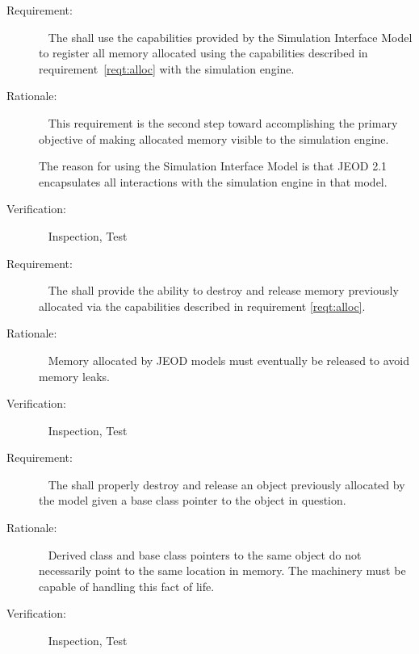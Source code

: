 \label{reqt:registration}
\begin{description}
\item[Requirement:]\ \newline
  The \ModelDesc shall use the capabilities provided by the Simulation
  Interface Model to register all memory allocated using the capabilities
  described in requirement~\ref{reqt:alloc} with the simulation engine.

\item[Rationale:]\ \newline
  This requirement is the second step toward accomplishing the primary objective
  of making allocated memory visible to the simulation engine.

  The reason for using the Simulation Interface Model is that JEOD 2.1
  encapsulates all interactions with the simulation engine in that model.

\item[Verification:]\ \newline
  Inspection, Test
\end{description}


\label{reqt:free}
\begin{description}
\item[Requirement:]\ \newline
  The \ModelDesc shall provide the ability to destroy and release memory
  previously allocated via the capabilities described in requirement
  \ref{reqt:alloc}.

\item[Rationale:]\ \newline
  Memory allocated by JEOD models must eventually be released to
  avoid memory leaks.

\item[Verification:]\ \newline
  Inspection, Test
\end{description}


\label{reqt:base_class_pointer_free}
\begin{description}
\item[Requirement:]\ \newline
  The \ModelDesc shall properly destroy and release an object previously
  allocated by the model given a base class pointer to the object in question.

\item[Rationale:]\ \newline
  Derived class and base class pointers to the same object do not necessarily
  point to the same location in memory. The \ModelDesc machinery must be
  capable of handling this fact of life.

\item[Verification:]\ \newline
  Inspection, Test
\end{description}


